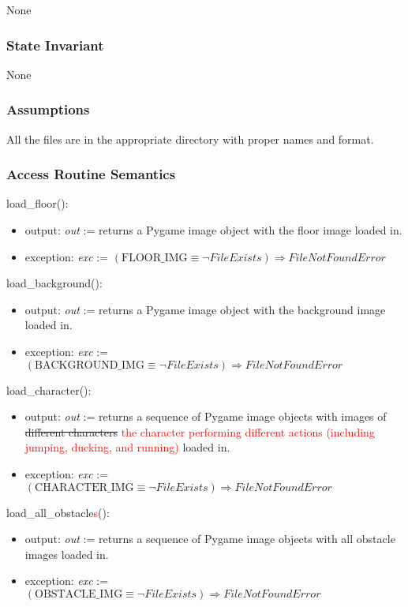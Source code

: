 \documentclass[12pt]{article}
\begin{document}
None

\subsubsection* {State Invariant}

None

\subsubsection* {Assumptions}

All the files are in the appropriate directory with proper names and format.

\subsubsection* {Access Routine Semantics}

load\_floor():
\begin{itemize}
    \item output: \textit{out} := returns a Pygame image object with the floor image loaded in.
    \item exception: \textit{exc} := $(\text{FLOOR\_IMG} \equiv \neg FileExists) \Rightarrow FileNotFoundError$
\end{itemize}

\noindent load\_background():
\begin{itemize}
    \item output: \textit{out} := returns a Pygame image object with the background image loaded in.
    \item exception: \textit{exc} := $(\text{BACKGROUND\_IMG} \equiv \neg FileExists) \Rightarrow FileNotFoundError$
\end{itemize}

\noindent load\_character():
\begin{itemize}
    \item output: \textit{out} := returns a sequence of Pygame image objects with images of \sout{different characters} \textcolor{red}{the character performing different actions (including jumping, ducking, and running)} loaded in.
    \item exception: \textit{exc} := $(\text{CHARACTER\_IMG} \equiv \neg FileExists) \Rightarrow FileNotFoundError$
\end{itemize}

\noindent load\_all\_obstacle\textcolor{red}{s}():
\begin{itemize}
    \item output: \textit{out} := returns a sequence of Pygame image objects with all obstacle images loaded in.
    \item exception: \textit{exc} := $(\text{OBSTACLE\_IMG} \equiv \neg FileExists) \Rightarrow FileNotFoundError$
\end{itemize}
\end{document}
